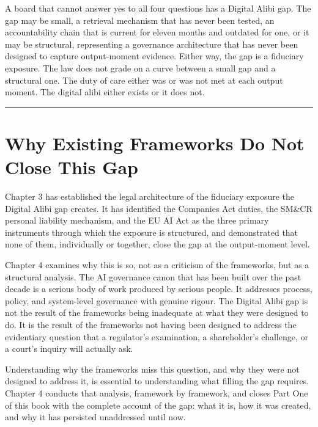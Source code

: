 A board that cannot answer yes to all four questions has a Digital Alibi gap. The gap may be small, a retrieval mechanism that has never been tested, an accountability chain that is current for eleven months and outdated for one, or it may be structural, representing a governance architecture that has never been designed to capture output-moment evidence. Either way, the gap is a fiduciary exposure. The law does not grade on a curve between a small gap and a structural one. The duty of care either was or was not met at each output moment. The digital alibi either exists or it does not.

\begin{center}\rule{0.5\linewidth}{0.5pt}\end{center}

\section{Why Existing Frameworks Do Not Close This Gap}

Chapter 3 has established the legal architecture of the fiduciary exposure the Digital Alibi gap creates. It has identified the Companies Act duties, the SM\&CR personal liability mechanism, and the EU AI Act as the three primary instruments through which the exposure is structured, and demonstrated that none of them, individually or together, close the gap at the output-moment level.

Chapter 4 examines why this is so, not as a criticism of the frameworks, but as a structural analysis. The AI governance canon that has been built over the past decade is a serious body of work produced by serious people. It addresses process, policy, and system-level governance with genuine rigour. The Digital Alibi gap is not the result of the frameworks being inadequate at what they were designed to do. It is the result of the frameworks not having been designed to address the evidentiary question that a regulator's examination, a shareholder's challenge, or a court's inquiry will actually ask.

Understanding why the frameworks miss this question, and why they were not designed to address it, is essential to understanding what filling the gap requires. Chapter 4 conducts that analysis, framework by framework, and closes Part One of this book with the complete account of the gap: what it is, how it was created, and why it has persisted unaddressed until now.
